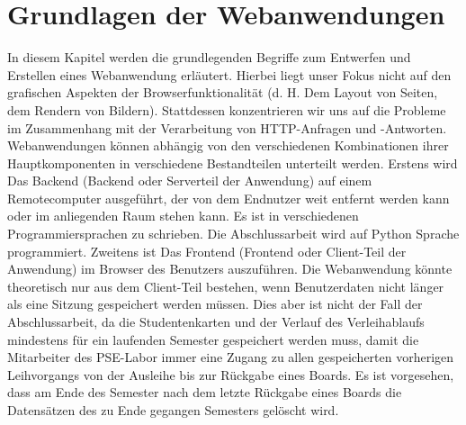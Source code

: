 \section{Grundlagen der Webanwendungen}
\label{sec:theorie:webapp}
In diesem Kapitel werden die grundlegenden Begriffe zum Entwerfen und Erstellen eines Webanwendung erläutert. Hierbei liegt unser Fokus nicht auf den grafischen Aspekten der Browserfunktionalität (d. H. Dem Layout von Seiten, dem Rendern von Bildern). Stattdessen konzentrieren wir uns auf die Probleme im Zusammenhang mit der Verarbeitung von HTTP-Anfragen und -Antworten. Webanwendungen können abhängig von den verschiedenen Kombinationen ihrer Hauptkomponenten in verschiedene Bestandteilen unterteilt werden. Erstens wird Das Backend (Backend oder Serverteil der Anwendung) auf einem Remotecomputer ausgeführt, der von dem Endnutzer weit entfernt werden kann oder im anliegenden Raum stehen kann.  Es ist in verschiedenen Programmiersprachen zu schrieben. Die Abschlussarbeit wird auf Python Sprache programmiert. Zweitens ist Das Frontend (Frontend oder Client-Teil der Anwendung) im Browser des Benutzers auszuführen. Die Webanwendung könnte theoretisch nur aus dem Client-Teil bestehen, wenn Benutzerdaten nicht länger als eine Sitzung gespeichert werden müssen. Dies aber ist nicht der Fall der Abschlussarbeit, da die Studentenkarten und der Verlauf des Verleihablaufs mindestens für ein laufenden Semester gespeichert werden muss, damit die Mitarbeiter des PSE-Labor immer eine Zugang zu allen gespeicherten vorherigen Leihvorgangs von der Ausleihe bis zur Rückgabe eines Boards. Es ist vorgesehen, dass am Ende des Semester nach dem letzte Rückgabe eines Boards die Datensätzen des zu Ende gegangen Semesters gelöscht wird. 

